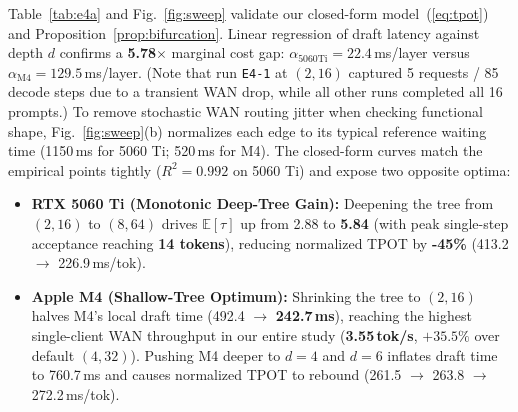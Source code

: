 \documentclass[10pt,conference]{IEEEtran}
\begin{document}
Table~\ref{tab:e4a} and Fig.~\ref{fig:sweep} validate our closed-form model~(\ref{eq:tpot}) and Proposition~\ref{prop:bifurcation}. Linear regression of draft latency against depth $d$ confirms a \textbf{5.78$\times$} marginal cost gap: $\alpha_{\text{5060Ti}} = 22.4$\,ms/layer versus $\alpha_{\text{M4}} = 129.5$\,ms/layer. (Note that run \texttt{E4-1} at $(2,16)$ captured 5 requests / 85 decode steps due to a transient WAN drop, while all other runs completed all 16 prompts.) To remove stochastic WAN routing jitter when checking functional shape, Fig.~\ref{fig:sweep}(b) normalizes each edge to its typical reference waiting time (1150\,ms for 5060 Ti; 520\,ms for M4). The closed-form curves match the empirical points tightly ($R^2 = 0.992$ on 5060 Ti) and expose two opposite optima:
\begin{itemize}
  \item \textbf{RTX 5060 Ti (Monotonic Deep-Tree Gain):} Deepening the tree from $(2, 16)$ to $(8, 64)$ drives $\mathbb{E}[\tau]$ up from 2.88 to \textbf{5.84} (with peak single-step acceptance reaching \textbf{14 tokens}), reducing normalized TPOT by \textbf{-45\%} (413.2 $\to$ 226.9\,ms/tok).
  \item \textbf{Apple M4 (Shallow-Tree Optimum):} Shrinking the tree to $(2, 16)$ halves M4's local draft time (492.4 $\to$ \textbf{242.7\,ms}), reaching the highest single-client WAN throughput in our entire study (\textbf{3.55\,tok/s}, $+35.5\%$ over default $(4,32)$). Pushing M4 deeper to $d{=}4$ and $d{=}6$ inflates draft time to 760.7\,ms and causes normalized TPOT to rebound (261.5 $\to$ 263.8 $\to$ 272.2\,ms/tok).
\end{itemize}
\end{document}
